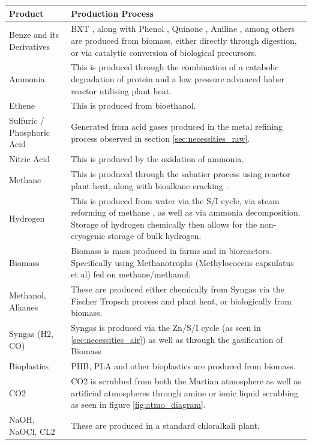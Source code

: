 \documentclass[fleqn,10pt]{Stylesheet} %
\begin{document}
\begin{table}
\label{tab:bulk_products}
\centering
\begin{tabular}{|m{4cm}|L|}\hline
\textbf{Product} & \textbf{Production Process} \\\hline
Benze and its Derivatives &	BXT \cite{QingfengChe2019}, along with Phenol \cite{2001Gibson}, Quinone \cite{NingqingRan2001}, Aniline \cite{Pharkya2020}, among others \cite{JianLi2017} are produced from biomass, either directly through digestion, or via catalytic conversion of biological precursors. \\\hline
Ammonia & This is produced through the combination of a catabolic degradation of protein \cite{KwonYoungChoi2014} and a low pressure advanced haber reactor \cite{BosongLin2019} utilising plant heat.\\\hline
Ethene & This is produced from bioethanol.\\\hline
Sulfuric / Phosphoric Acid &  Generated from acid gases produced in the metal refining process observed in section \ref{sec:necessities_raw}. \\\hline
Nitric Acid & This is produced by the oxidation of ammonia.\\\hline
Methane & This is produced through the sabatier \cite{JohnBucknell2014} process using reactor plant heat, along with bioalkane cracking \cite{2004JoseComas, XWang2002}.\\\hline
Hydrogen &  This is produced from water via the S/I cycle, via steam reforming of methane \cite{JianhuaTong2006}, as well as via ammonia decomposition. Storage of hydrogen chemically then allows for the non-cryogenic storage of bulk hydrogen.\\\hline
Biomass & Biomass is mass produced in farms and in bioreactors. Specifically using Methanotrophs (Methylococcus capsulatus et al) fed on methane/methanol. \\\hline
Methanol, Alkanes & These are produced either chemically from Syngas via the Fischer Tropsch process and plant heat, or biologically from biomass. \\\hline
Syngas (H2, CO) & Syngas is produced via the Zn/S/I cycle (as seen in \ref{sec:necessities_air}) as well as through the gasification of Biomass \\\hline
Bioplastics & PHB, PLA and other bioplastics are produced from biomass. \\\hline
CO2 & CO2 is scrubbed from both the Martian atmosphere as well as artificial atmospheres through amine or ionic liquid scrubbing \cite{Lotto2018,StephenYates2016} as seen in figure \ref{fig:atmo_diagram}. \\\hline
NaOH, NaOCl, CL2 & These are produced in a standard chloralkali plant. \\\hline
\end{tabular}
\end{table}
\end{document}
